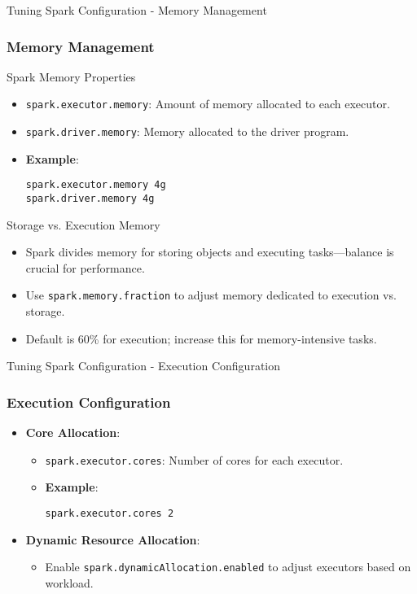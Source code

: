 \documentclass[aspectratio=169]{beamer}
\begin{document}
\begin{frame}[fragile]{Tuning Spark Configuration - Memory Management}
    \frametitle{Memory Management}
    
    \begin{block}{Spark Memory Properties}
        \begin{itemize}
            \item \texttt{spark.executor.memory}: Amount of memory allocated to each executor.
            \item \texttt{spark.driver.memory}: Memory allocated to the driver program.
            \item \textbf{Example}:
            \begin{lstlisting}
spark.executor.memory 4g
spark.driver.memory 4g
            \end{lstlisting}
        \end{itemize}
    \end{block}

    \begin{block}{Storage vs. Execution Memory}
        \begin{itemize}
            \item Spark divides memory for storing objects and executing tasks—balance is crucial for performance.
            \item Use \texttt{spark.memory.fraction} to adjust memory dedicated to execution vs. storage.
            \item Default is 60\% for execution; increase this for memory-intensive tasks.
        \end{itemize}
    \end{block}
\end{frame}

\begin{frame}[fragile]{Tuning Spark Configuration - Execution Configuration}
    \frametitle{Execution Configuration}
    
    \begin{itemize}
        \item \textbf{Core Allocation}:
        \begin{itemize}
            \item \texttt{spark.executor.cores}: Number of cores for each executor.
            \item \textbf{Example}:
            \begin{lstlisting}
spark.executor.cores 2
            \end{lstlisting}
        \end{itemize}
        
        \item \textbf{Dynamic Resource Allocation}:
        \begin{itemize}
            \item Enable \texttt{spark.dynamicAllocation.enabled} to adjust executors based on workload.
        \end{itemize}
    \end{itemize}
\end{frame}
\end{document}
